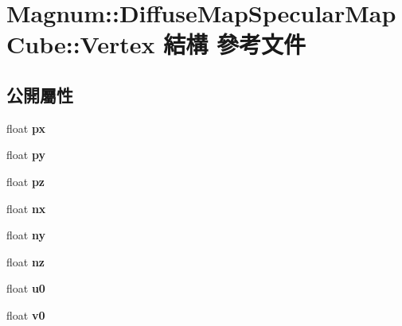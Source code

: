 \hypertarget{struct_magnum_1_1_diffuse_map_specular_map_cube_1_1_vertex}{}\section{Magnum\+:\+:Diffuse\+Map\+Specular\+Map\+Cube\+:\+:Vertex 結構 參考文件}
\label{struct_magnum_1_1_diffuse_map_specular_map_cube_1_1_vertex}
\subsection*{公開屬性}
\begin{DoxyCompactItemize}
\item 
float {\bfseries px}\hypertarget{struct_magnum_1_1_diffuse_map_specular_map_cube_1_1_vertex_a3206559b6bc90dd44d1e57c18a62e551}{}\label{struct_magnum_1_1_diffuse_map_specular_map_cube_1_1_vertex_a3206559b6bc90dd44d1e57c18a62e551}

\item 
float {\bfseries py}\hypertarget{struct_magnum_1_1_diffuse_map_specular_map_cube_1_1_vertex_afe5cb45b3c19136b5b3978578af1ece5}{}\label{struct_magnum_1_1_diffuse_map_specular_map_cube_1_1_vertex_afe5cb45b3c19136b5b3978578af1ece5}

\item 
float {\bfseries pz}\hypertarget{struct_magnum_1_1_diffuse_map_specular_map_cube_1_1_vertex_ae9a5ec6f629ae55a0026f3e6622bceb1}{}\label{struct_magnum_1_1_diffuse_map_specular_map_cube_1_1_vertex_ae9a5ec6f629ae55a0026f3e6622bceb1}

\item 
float {\bfseries nx}\hypertarget{struct_magnum_1_1_diffuse_map_specular_map_cube_1_1_vertex_a25dae0868f0b4b66bd33876014781e9c}{}\label{struct_magnum_1_1_diffuse_map_specular_map_cube_1_1_vertex_a25dae0868f0b4b66bd33876014781e9c}

\item 
float {\bfseries ny}\hypertarget{struct_magnum_1_1_diffuse_map_specular_map_cube_1_1_vertex_a9f67f518970b99845634ab5ef48fbbe0}{}\label{struct_magnum_1_1_diffuse_map_specular_map_cube_1_1_vertex_a9f67f518970b99845634ab5ef48fbbe0}

\item 
float {\bfseries nz}\hypertarget{struct_magnum_1_1_diffuse_map_specular_map_cube_1_1_vertex_ae8791218eb3d7ff71e79832fd6509137}{}\label{struct_magnum_1_1_diffuse_map_specular_map_cube_1_1_vertex_ae8791218eb3d7ff71e79832fd6509137}

\item 
float {\bfseries u0}\hypertarget{struct_magnum_1_1_diffuse_map_specular_map_cube_1_1_vertex_ab1dac4bc12f46379873226f99b0bf376}{}\label{struct_magnum_1_1_diffuse_map_specular_map_cube_1_1_vertex_ab1dac4bc12f46379873226f99b0bf376}

\item 
float {\bfseries v0}\hypertarget{struct_magnum_1_1_diffuse_map_specular_map_cube_1_1_vertex_a2179ae26ef089c8f7ab2bb90473f4356}{}\label{struct_magnum_1_1_diffuse_map_specular_map_cube_1_1_vertex_a2179ae26ef089c8f7ab2bb90473f4356}

\end{DoxyCompactItemize}
